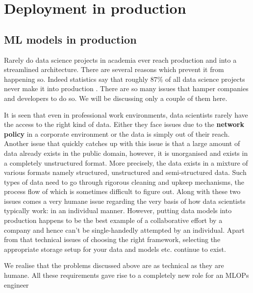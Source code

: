 \chapter{Deployment in production} \label{chapter4}

\section{ML models in production}

Rarely do data science projects in academia ever reach production and
into a streamlined architecture. There are several reasons which
prevent it from happening so. Indeed statistics say that roughly
$87\%$ of all data science projects never make it into production
\cite{vb2019}.  There are so many issues that hamper companies and
developers to do so. We will be discussing only a couple of them here. \par

It is seen that even in professional work environments, data
scientists rarely have the access to the right kind of data. Either
they face issues due to the \textbf{network policy} in a corporate
environment or the data is simply out of their reach. Another issue
that quickly catches up with this issue is that a large amount of
data already exists in the public domain, however, it is unorganised
and exists in a completely unstructured format. More precisely, the
data exists in a mixture of various formats namely structured,
unstructured and semi-structured data. Such types of data need to go
through rigorous cleaning and upkeep mechanisms, the process flow of
which is sometimes difficult to figure out. Along with these two
issues comes a very humane issue regarding the very basis of how data
scientists typically work: in an individual manner. However, putting
data models into production happens to be the best example of a
collaborative effort by a company and hence can’t be single-handedly
attempted by an individual. Apart from that technical issues of
choosing the right framework, selecting the appropriate storage setup
for your data and models etc. continue to exist.\par

We realise that the problems discussed above are as technical as they
are humane. All these requirements gave rise to a completely new role
for an MLOPs engineer \cite{Odegua2020}

